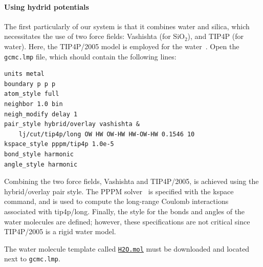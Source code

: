 \documentclass[9pt,tutorial]{livecoms}
\newcommand{\lmpcmd}[1]{\hspace{0pt}\colorbox{listing}{\textcolor{command}{\small{#1}}}\hspace{0pt}} %
\newcommand{\flecmd}[1]{\textcolor{command}{\texttt{#1}}} %
\newcommand{\dwlcmd}[1]{\textcolor{download}{\texttt{#1}}} %
\newcommand{\filepath}{https://raw.githubusercontent.com/lammpstutorials/lammpstutorials-article/main/files/}
\begin{document}
\paragraph{Using hydrid potentials}

The first particularly of our system is that it combines water and
silica, which necessitates the use of two force fields: Vashishta (for
$\text{SiO}_2$), and TIP4P (for water).  Here, the TIP4P/2005 model is
employed for the water~\cite{abascal2005general}.  Open the
\flecmd{gcmc.lmp} file, which should contain the following lines:
\begin{lstlisting}
units metal
boundary p p p
atom_style full
neighbor 1.0 bin
neigh_modify delay 1
pair_style hybrid/overlay vashishta &
    lj/cut/tip4p/long OW HW OW-HW HW-OW-HW 0.1546 10
kspace_style pppm/tip4p 1.0e-5
bond_style harmonic
angle_style harmonic
\end{lstlisting}
Combining the two force fields, Vashishta and TIP4P/2005, is achieved
using the \lmpcmd{hybrid/overlay} pair style.  The PPPM
solver~\cite{luty1996calculating} is specified with the \lmpcmd{kspace}
command, and is used to compute the long-range Coulomb interactions associated
with \lmpcmd{tip4p/long}.  Finally, the style for the bonds
and angles of the water molecules are defined; however, these specifications are
not critical since TIP4P/2005 is a rigid water model.

The water molecule template called \href{\filepath tutorial6/H2O.mol}{\dwlcmd{H2O.mol}}
must be downloaded and located next to \flecmd{gcmc.lmp}.
\end{document}
